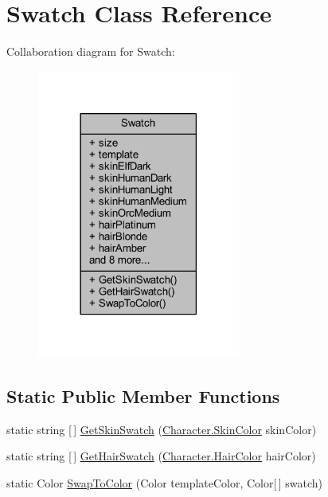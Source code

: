 \hypertarget{class_swatch}{}\section{Swatch Class Reference}
\label{class_swatch}


Collaboration diagram for Swatch\+:
\nopagebreak
\begin{figure}[H]
\begin{center}
\leavevmode
\includegraphics[width=189pt]{class_swatch__coll__graph}
\end{center}
\end{figure}
\subsection*{Static Public Member Functions}
\begin{DoxyCompactItemize}
\item 
static string \mbox{[}$\,$\mbox{]} \mbox{\hyperlink{class_swatch_aad8681cfc4c7902a684220e08e67b00b}{Get\+Skin\+Swatch}} (\mbox{\hyperlink{class_character_a726214a0fe480fffada7772697764824}{Character.\+Skin\+Color}} skin\+Color)
\item 
static string \mbox{[}$\,$\mbox{]} \mbox{\hyperlink{class_swatch_ad9aee8913b15b1cd21e4d734aeb00f6b}{Get\+Hair\+Swatch}} (\mbox{\hyperlink{class_character_a7940fffce9bfadb9e7abf15490cf8bb0}{Character.\+Hair\+Color}} hair\+Color)
\item 
static Color \mbox{\hyperlink{class_swatch_aa6e64b48c8403d88179beb90da11c2f8}{Swap\+To\+Color}} (Color template\+Color, Color\mbox{[}$\,$\mbox{]} swatch)
\end{DoxyCompactItemize}
